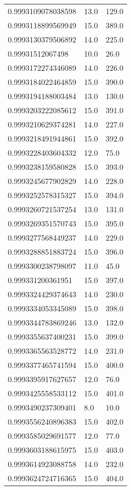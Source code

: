 \begin{center}
\begin{supertabular}[H]{p{0.30\textwidth}p{0.05\textwidth}p{0.05\textwidth}}
0.9993109078038598 & 13.0 & 129.0 \\ 
0.9993118899569949 & 15.0 & 389.0 \\ 
0.9993130379506892 & 14.0 & 225.0 \\ 
0.99931512067498 & 10.0 & 26.0 \\ 
0.9993172274346089 & 14.0 & 226.0 \\ 
0.9993184022464859 & 15.0 & 390.0 \\ 
0.9993194188003484 & 13.0 & 130.0 \\ 
0.9993203222085612 & 15.0 & 391.0 \\ 
0.9993210629374281 & 14.0 & 227.0 \\ 
0.9993218491944861 & 15.0 & 392.0 \\ 
0.9993228403604332 & 12.0 & 75.0 \\ 
0.9993238159580828 & 15.0 & 393.0 \\ 
0.9993245677902829 & 14.0 & 228.0 \\ 
0.9993252578315327 & 15.0 & 394.0 \\ 
0.9993260721537254 & 13.0 & 131.0 \\ 
0.9993269351570743 & 15.0 & 395.0 \\ 
0.9993277568449237 & 14.0 & 229.0 \\ 
0.9993288851883724 & 15.0 & 396.0 \\ 
0.9993300238798097 & 11.0 & 45.0 \\ 
0.999331200361951 & 15.0 & 397.0 \\ 
0.9993324429374643 & 14.0 & 230.0 \\ 
0.9993334053345089 & 15.0 & 398.0 \\ 
0.9993344783869246 & 13.0 & 132.0 \\ 
0.9993355637400231 & 15.0 & 399.0 \\ 
0.9993365563528772 & 14.0 & 231.0 \\ 
0.9993377465741594 & 15.0 & 400.0 \\ 
0.9993395917627657 & 12.0 & 76.0 \\ 
0.9993425558533112 & 15.0 & 401.0 \\ 
0.9993490237309401 & 8.0 & 10.0 \\ 
0.9993556240896383 & 15.0 & 402.0 \\ 
0.9993585029691577 & 12.0 & 77.0 \\ 
0.9993603188615975 & 15.0 & 403.0 \\ 
0.9993614923088758 & 14.0 & 232.0 \\ 
0.9993624724716365 & 15.0 & 404.0 \\ 

\end{supertabular}
\end{center}
